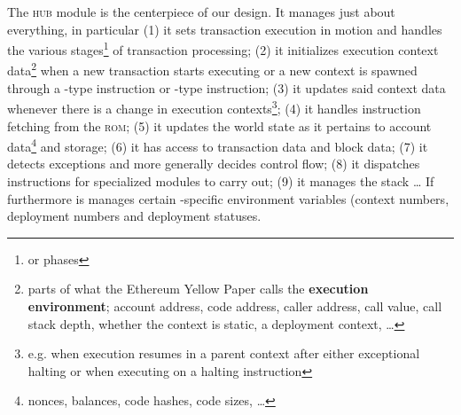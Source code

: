 The \textsc{hub} module is the centerpiece of our \zkEvm{} design.
It manages just about everything, in particular
(1) it sets transaction execution in motion and handles the various stages\footnote{or phases} of transaction processing;
(2) it initializes execution context data\footnote{parts of what the Ethereum Yellow Paper \cite{EYP} calls the \textbf{execution environment}; account address, code address, caller address, call value, call stack depth, whether the context is static, a deployment context, \dots{}} when a new transaction starts executing or a new context is spawned through a -type instruction or -type instruction;
(3) it updates said context data whenever there is a change in execution contexts\footnote{e.g. when execution resumes in a parent context after either exceptional halting or when executing on a halting instruction};
(4) it handles instruction fetching from the \textsc{rom};
(5) it updates the world state as it pertains to account data\footnote{nonces, balances, code hashes, code sizes, \dots{}} and storage;
(6) it has access to transaction data and block data;
(7) it detects exceptions and more generally decides control flow;
(8) it dispatches instructions for specialized modules to carry out;
(9) it manages the stack \dots{}
If furthermore is manages certain \zkEvm{}-specific environment variables (context numbers, deployment numbers and deployment statuses.
